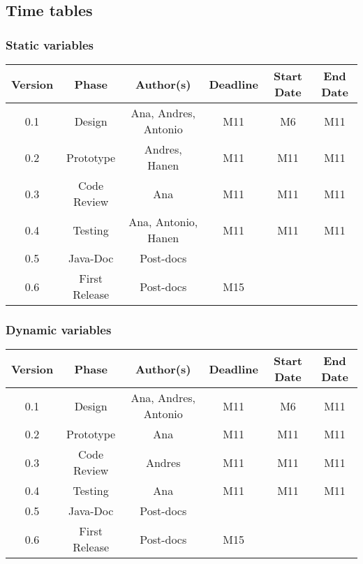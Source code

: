 \subsection{Time tables}

\subsubsection*{Static variables}

\begin{table}[H]
\begin{tabular}{cccccc}
\hline
\textbf{Version} & \textbf{Phase} & \textbf{Author(s)} & \textbf{Deadline} & \textbf{Start Date} & \textbf{End Date}\\
\hline
0.1 & Design & Ana, Andres, Antonio &  M11 & M6 & M11\\
\hline 
0.2 & Prototype & Andres, Hanen & M11 & M11 & M11\\
\hline 
0.3 & Code Review & Ana & M11  & M11 & M11\\
\hline 
0.4 & Testing & Ana, Antonio, Hanen & M11 & M11 & M11\\
\hline 
0.5 & Java-Doc  & Post-docs &  & & \\
\hline 
0.6 & First Release & Post-docs & M15 &  & \\
\hline
\end{tabular}
\end{table}

\subsubsection*{Dynamic variables}

\begin{table}[H]
\begin{tabular}{cccccc}
\hline
\textbf{Version} & \textbf{Phase} & \textbf{Author(s)} & \textbf{Deadline} & \textbf{Start Date} & \textbf{End Date}\\
\hline
0.1 & Design & Ana, Andres, Antonio & M11 & M6  & M11\\
\hline 
0.2 & Prototype & Ana & M11 & M11 & M11\\
\hline 
0.3 & Code Review & Andres & M11 & M11 & M11\\
\hline 
0.4 & Testing & Ana &  M11 & M11 & M11\\
\hline 
0.5 & Java-Doc  & Post-docs &  &  & \\
\hline 
0.6 & First Release & Post-docs & M15 &  & \\
\hline
\end{tabular}
\end{table}

